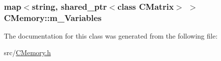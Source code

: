 \subsubsection[{\texorpdfstring{m\+\_\+\+Variables}{m_Variables}}]{\setlength{\rightskip}{0pt plus 5cm}map$<$string, shared\+\_\+ptr$<$class {\bf C\+Matrix}$>$ $>$ C\+Memory\+::m\+\_\+\+Variables}\hypertarget{classCMemory_a541cc8bf0e073f047e43e9d512aefbe7}{}\label{classCMemory_a541cc8bf0e073f047e43e9d512aefbe7}


The documentation for this class was generated from the following file\+:\begin{DoxyCompactItemize}
\item 
src/\hyperlink{CMemory_8h}{C\+Memory.\+h}\end{DoxyCompactItemize}
